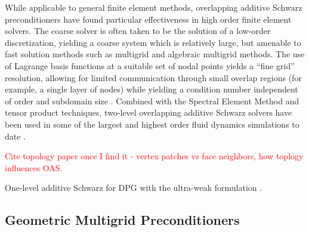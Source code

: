 While applicable to general finite element methods, overlapping additive Schwarz preconditioners have found particular effectiveness in high order finite element solvers.  The coarse solver is often taken to be the solution of a low-order discretization, yielding a coarse system which is relatively large, but amenable to fast solution methods such as multigrid and algebraic multigrid methods.  The use of Lagrange basis functions at a suitable set of nodal points yields a ``fine grid'' resolution, allowing for limited communication through small overlap regions (for example, a single layer of nodes) while yielding a condition number independent of order and subdomain size \cite{canuto2007spectral}.  Combined with the Spectral Element Method and tensor product techniques, two-level overlapping additive Schwarz solvers have been used in some of the largest and highest order fluid dynamics simulations to date  \cite{fischer1997overlapping}.  

\textcolor{red}{Cite topology paper once I find it - vertex patches vs face neighbors, how toplogy influences OAS.}

One-level additive Schwarz for DPG with the ultra-weak formulation \cite{barker2011overlapping}.  

\subsection{Geometric Multigrid Preconditioners}

\cite{WienersWohlmuth}

